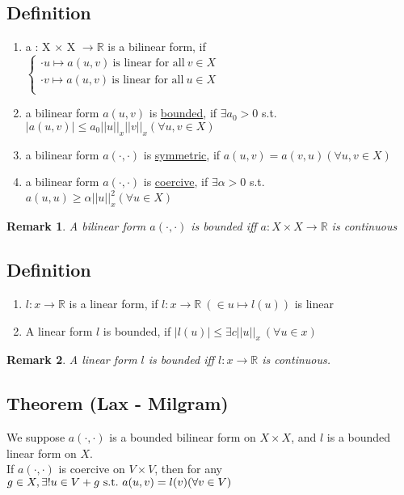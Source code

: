 \documentclass[a4paper,12pt]{article}
\newtheorem{remark}{Remark}[]
\newcommand{\R}{\mathbb{R}}
\begin{document}
\subsection{Definition}
\begin{enumerate}
	\item a : X $\times$ X $\rightarrow \R$ is a bilinear form, if\\
	$\begin{cases}
	\cdot u \mapsto a(u,v)\ \text{is linear for all}\ v \in X\\
	\cdot v \mapsto a(u,v)\ \text{is linear for all}\ u \in X\\
	\end{cases}$
	\item a bilinear form $a(u,v)$ is \underline{bounded}, if $\exists a_0>0$ s.t. $|a(u,v)| \leq a_0 ||u||_x ||v||_x (\forall u,v\in X)$
	\item a bilinear form $a(\cdot,\cdot)$ is \underline{symmetric}, if $a(u,v) = a(v,u)(\forall u,v \in X)$
	\item a bilinear form $a(\cdot,\cdot)$ is \underline{coercive}, if $\exists \alpha > 0$ s.t. $a(u,u)\geq \alpha ||u||^2_x (\forall u \in X)$
\end{enumerate}
\begin{remark}
	A bilinear form $a(\cdot,\cdot)$ is bounded iff $a: X \times X \rightarrow \R$ is continuous
\end{remark}
\subsection{Definition}
\begin{enumerate}
	\item $l: x \rightarrow \R$ is a linear form, if $l: x \rightarrow \R\ (\in u \mapsto l(u))$ is linear
	\item A linear form $l$ is bounded, if $|l(u)| \leq \exists c||u||_x\ (\forall u \in x)$
\end{enumerate}
\begin{remark}
	A linear form $l$ is bounded iff $l: x \rightarrow \R$ is continuous.
\end{remark}
\subsection{Theorem (Lax - Milgram)}
We suppose $a(\cdot,\cdot)$ is a bounded bilinear form on $X\times X$, and $l$ is a bounded linear form on $X$.\\
If $a(\cdot,\cdot)$ is coercive on $V\times V$, then for any $g\in X,\\ \exists! u\in V+g\ \text{s.t.}\ a(u,v)=l(v)(\forall v \in V)$
\end{document}
